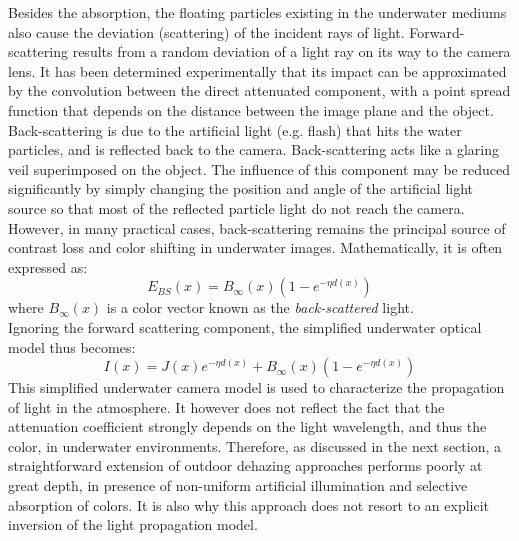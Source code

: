 \documentclass[hidelinks, 12pt]{report}
\begin{document}
Besides the absorption, the floating particles existing in the underwater mediums also cause the deviation (scattering) of the incident rays of light. Forward-scattering results from a random deviation of a light ray on its way to the camera lens. It has been determined experimentally that its impact can be approximated by the convolution between the direct attenuated component, with a point spread function that depends on the distance between the image plane and the object. Back-scattering is due to the artificial light (e.g. flash) that hits the water particles, and is reflected back to the camera. Back-scattering acts like a glaring veil superimposed on the object. The influence of this component may be reduced significantly by simply changing the position and angle of the artificial light source so that most of the reflected particle light do not reach the camera. However, in many practical cases, back-scattering remains the principal source of contrast loss and color shifting in underwater images. Mathematically, it is often expressed as:
\begin{equation}
E_{BS}(x)=B_{\infty}(x)(1-e^{-\eta d(x)})
\end{equation}
where $B_{\infty}(x)$ is a color vector known as the \textit{back-scattered} light.\\
Ignoring the forward scattering component, the simplified underwater optical model thus becomes:
\begin{equation}
I(x)=J(x)e^{-\eta d(x)}+B_{\infty}(x)(1-e^{-\eta d(x)})
\end{equation}
This simplified underwater camera model is used to characterize the propagation of light in the atmosphere. It however does not reflect the fact that the attenuation coefficient strongly depends on the light wavelength, and thus the color, in underwater environments. Therefore, as discussed in the next section, a straightforward extension of outdoor dehazing approaches performs poorly at great depth, in presence of non-uniform artificial illumination and selective absorption of colors. It is also why this approach does not resort to an explicit inversion of the light propagation model.
\end{document}
